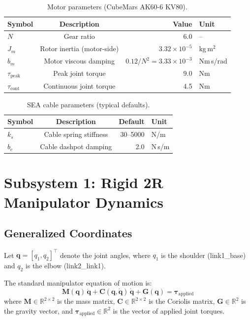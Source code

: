 \documentclass[11pt, a4paper]{article}
\newcommand{\bq}{\bm{q}}
\newcommand{\btau}{\bm{\tau}}
\newcommand{\bM}{\bm{M}}
\newcommand{\bC}{\bm{C}}
\newcommand{\bG}{\bm{G}}
\newcommand{\R}{\mathbb{R}}
\begin{document}
\begin{table}[h]
\centering
\caption{Motor parameters (CubeMars AK60-6 KV80).}
\label{tab:motor}
\begin{tabular}{@{}lcrl@{}}
\toprule
Symbol & Description & Value & Unit \\
\midrule
$N$         & Gear ratio                  & 6.0       & -- \\
$J_m$       & Rotor inertia (motor-side)  & $3.32 \times 10^{-5}$ & kg\,m$^2$ \\
$b_m$       & Motor viscous damping       & $0.12/N^2 = 3.33 \times 10^{-3}$ & Nm\,s/rad \\
$\tau_\text{peak}$ & Peak joint torque    & 9.0       & Nm \\
$\tau_\text{cont}$ & Continuous joint torque & 4.5    & Nm \\
\bottomrule
\end{tabular}
\end{table}

\begin{table}[h]
\centering
\caption{SEA cable parameters (typical defaults).}
\label{tab:sea}
\begin{tabular}{@{}lcrl@{}}
\toprule
Symbol & Description & Default & Unit \\
\midrule
$k_s$   & Cable spring stiffness & 30--5000 & N/m \\
$b_c$   & Cable dashpot damping  & 2.0      & N\,s/m \\
\bottomrule
\end{tabular}
\end{table}


\section{Subsystem 1: Rigid 2R Manipulator Dynamics}
\label{sec:manip}

\subsection{Generalized Coordinates}

Let $\bq = [q_1, q_2]^\top$ denote the joint angles, where $q_1$ is the
shoulder (link1\_base) and $q_2$ is the elbow (link2\_link1).

The standard manipulator equation of motion is:
\begin{equation}
\label{eq:manip-eom}
\bM(\bq)\,\ddot{\bq} + \bC(\bq, \dot{\bq})\,\dot{\bq} + \bG(\bq) = \btau_\text{applied}
\end{equation}
where $\bM \in \R^{2 \times 2}$ is the mass matrix,
$\bC \in \R^{2 \times 2}$ is the Coriolis matrix,
$\bG \in \R^2$ is the gravity vector, and
$\btau_\text{applied} \in \R^2$ is the vector of applied joint torques.
\end{document}

